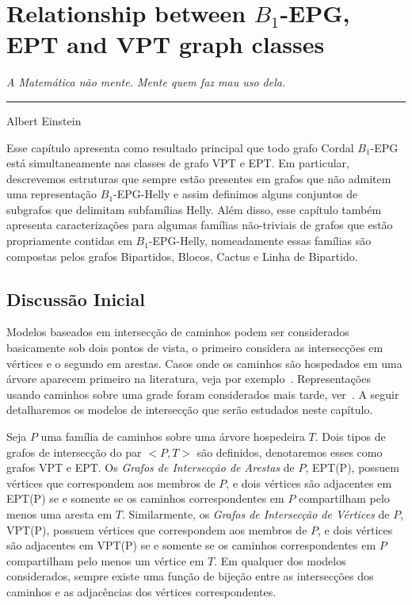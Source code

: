 \chapter{Relationship between  $B_1$-EPG, EPT and VPT graph classes}
\label{cap:v}

\begin{flushright}
\begin{minipage}[t][0cm][b]{0.47\textwidth}
\emph{
A Matemática não mente. Mente quem faz mau uso dela.}
\end{minipage}

\rule[0cm]{7cm}{0.03cm}%

Albert Einstein
\end{flushright}

Esse capítulo apresenta como resultado principal que todo grafo Cordal $B_1$-EPG está simultaneamente nas classes de grafo VPT e EPT. Em particular, descrevemos estruturas que sempre estão presentes em grafos que não admitem uma representação $B_1$-EPG-Helly e assim definimos alguns conjuntos de subgrafos que delimitam subfamílias Helly.   
Além disso, esse capítulo também apresenta caracterizações para algumas famílias não-triviais de grafos que estão propriamente contidas em   $B_1$-EPG-Helly, nomeadamente essas famílias são compostas pelos grafos Bipartidos, Blocos, Cactus e Linha de Bipartido. 



\section{Discussão Inicial}

Modelos baseados em intersecção de caminhos podem ser considerados basicamente sob dois pontos de vista, o primeiro considera as intersecções em vértices e o segundo em arestas. Casos onde os caminhos são hospedados em uma árvore aparecem primeiro na literatura, veja por exemplo~\cite{gavril1978recognition, golumbic1985edge, golumbic1985}.  Representações usando caminhos sobre uma grade foram considerados mais tarde, ver~\cite{golumbic2009,golumbic2013, golumbic2013intersection}. A seguir detalharemos os modelos de intersecção que serão estudados neste capítulo. %

 Seja $P$ uma família de caminhos sobre uma árvore hospedeira $T$. Dois tipos de grafos de intersecção do par  $<P,T>$ são definidos, denotaremos esses como grafos VPT e EPT.
Os \textit{Grafos de Intersecção de Arestas} de $P$, EPT(P), possuem  vértices que correspondem aos membros de $P$, e dois vértices são  adjacentes em EPT(P) se e somente se os caminhos correspondentes em $P$ compartilham pelo menos uma aresta em $T$. Similarmente, os \textit{Grafos de Intersecção de Vértices} de $P$, VPT(P), possuem vértices que correspondem aos membros de  $P$, e dois vértices são adjacentes em VPT(P) se e somente se os caminhos correspondentes em  $P$ compartilham pelo menos um vértice em $T$. Em qualquer dos modelos considerados, sempre existe uma função de bijeção entre as intersecções dos caminhos e as adjacências dos vértices correspondentes. 


